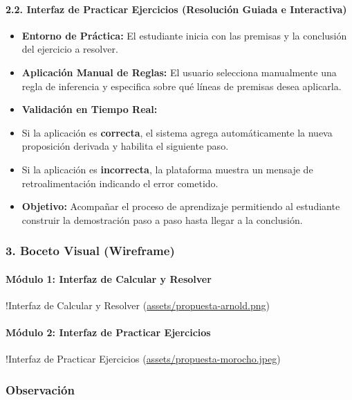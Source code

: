 \documentclass[11pt,a4paper,openany]{book}
\begin{document}
\paragraph{2.2. Interfaz de Practicar Ejercicios (Resolución Guiada e Interactiva)}
\begin{itemize}[leftmargin=*]
\item \textbf{Entorno de Práctica:} El estudiante inicia con las premisas y la conclusión del ejercicio a resolver.
\item \textbf{Aplicación Manual de Reglas:} El usuario selecciona manualmente una regla de inferencia y especifica sobre qué líneas de premisas desea aplicarla.
\item \textbf{Validación en Tiempo Real:}
\item Si la aplicación es \textbf{correcta}, el sistema agrega automáticamente la nueva proposición derivada y habilita el siguiente paso.
\item Si la aplicación es \textbf{incorrecta}, la plataforma muestra un mensaje de retroalimentación indicando el error cometido.
\item \textbf{Objetivo:} Acompañar el proceso de aprendizaje permitiendo al estudiante construir la demostración paso a paso hasta llegar a la conclusión.
\end{itemize}

\hrulefill

\subsubsection{3. Boceto Visual (Wireframe)}

\paragraph{Módulo 1: Interfaz de Calcular y Resolver}
!Interfaz de Calcular y Resolver (\url{assets/propuesta-arnold.png})

\paragraph{Módulo 2: Interfaz de Practicar Ejercicios}
!Interfaz de Practicar Ejercicios (\url{assets/propuesta-morocho.jpeg})

\hrulefill

\subsubsection{Observación}
\end{document}
